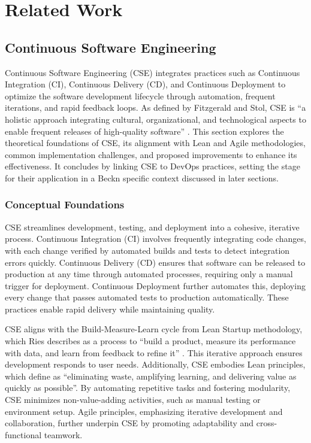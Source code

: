 \section{Related Work}
\label{related_work}
\subsection{Continuous Software Engineering}
\label{continuous_software_engineering}
Continuous Software Engineering (CSE) integrates practices such as Continuous Integration (CI), Continuous Delivery (CD), and Continuous Deployment to optimize the software development lifecycle through automation, frequent iterations, and rapid feedback loops. As defined by Fitzgerald and Stol, CSE is ``a holistic approach integrating cultural, organizational, and technological aspects to enable frequent releases of high-quality software'' \citep{fitzgerald2015continuous}. This section explores the theoretical foundations of CSE, its alignment with Lean and Agile methodologies, common implementation challenges, and proposed improvements to enhance its effectiveness. It concludes by linking CSE to DevOps practices, setting the stage for their application in a Beckn specific context discussed in later sections.

\subsubsection{Conceptual Foundations}
\label{cse_conceptual_foundations}
CSE streamlines development, testing, and deployment into a cohesive, iterative process. Continuous Integration (CI) involves frequently integrating code changes, with each change verified by automated builds and tests to detect integration errors quickly. Continuous Delivery (CD) ensures that software can be released to production at any time through automated processes, requiring only a manual trigger for deployment. Continuous Deployment further automates this, deploying every change that passes automated tests to production automatically. These practices enable rapid delivery while maintaining quality.

CSE aligns with the Build-Measure-Learn cycle from Lean Startup methodology, which Ries describes as a process to ``build a product, measure its performance with data, and learn from feedback to refine it'' \citep{ries2011lean}. This iterative approach ensures development responds to user needs. Additionally, CSE embodies Lean principles, which \citet{poppendieck2003lean} define as ``eliminating waste, amplifying learning, and delivering value as quickly as possible''. By automating repetitive tasks and fostering modularity, CSE minimizes non-value-adding activities, such as manual testing or environment setup. Agile principles, emphasizing iterative development and collaboration, further underpin CSE by promoting adaptability and cross-functional teamwork.

